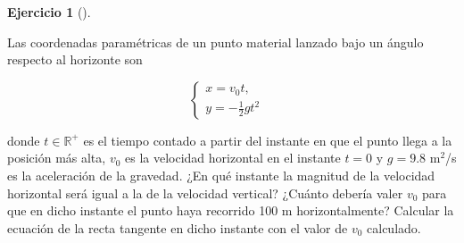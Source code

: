 \documentclass[
  a4paper,
]{scrreport}
\theoremstyle{definition}
\newtheorem{exercise}{Ejercicio}[chapter]
\theoremstyle{remark}
\begin{document}
\begin{exercise}[]\protect\hypertarget{exr-cinematica-2}{}\label{exr-cinematica-2}

Las coordenadas paramétricas de un punto material lanzado bajo un ángulo
respecto al horizonte son

\[
\begin{cases}
x=v_0t, & \\
y=-\frac{1}{2}gt^2
\end{cases}
\]

donde \(t\in \mathbb{R}^{+}\) es el tiempo contado a partir del instante
en que el punto llega a la posición más alta, \(v_0\) es la velocidad
horizontal en el instante \(t=0\) y \(g=9.8\) m\(^2\)/s es la
aceleración de la gravedad. ¿En qué instante la magnitud de la velocidad
horizontal será igual a la de la velocidad vertical? ¿Cuánto debería
valer \(v_0\) para que en dicho instante el punto haya recorrido 100 m
horizontalmente? Calcular la ecuación de la recta tangente en dicho
instante con el valor de \(v_0\) calculado.

\end{exercise}
\end{document}
